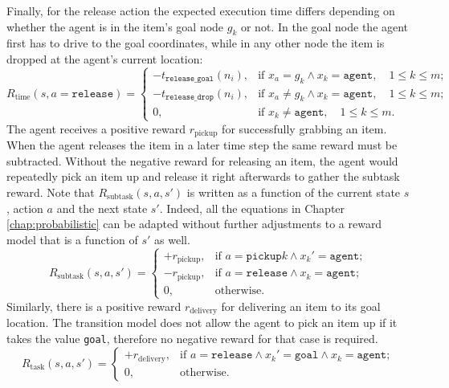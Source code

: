 Finally, for the release action the expected execution time differs depending on whether the agent is in the item's goal node $g_k$ or not. In the goal node the agent first has to drive to the goal coordinates, while in any other node the item is dropped at the agent's current location: 
\begin{equation}
     R_\text{time}(s, a=\texttt{release}) = \begin{cases}
    -t_\texttt{release\_goal}(n_i), & \text{if }x_a=g_k \land x_k=\texttt{agent}, \quad 1 \leq k \leq m; \\
    -t_\texttt{release\_drop}(n_i), & \text{if }x_a\neq g_k \land x_k=\texttt{agent}, \quad 1 \leq k \leq m;\\
    0, & \text{if }x_k \neq \texttt{agent}, \quad 1 \leq k \leq m.
    \end{cases}
\end{equation}
The agent receives a positive reward $r_\text{pickup}$ for successfully grabbing an item. When the agent releases the item in a later time step the same reward must be subtracted. Without the negative reward for releasing an item, the agent would repeatedly pick an item up and release it right afterwards to gather the subtask reward. Note that $R_\text{subtask}(s,a,s')$ is written as a function of the current state $s$, action $a$ and the next state $s'$. Indeed, all the equations in Chapter \ref{chap:probabilistic} can be adapted without further adjustments to a reward model that is a function of $s'$ as well. 
\begin{equation}
    R_\text{subtask}(s,a,s') = \begin{cases}
    +r_\text{pickup}, & \text{if }a=\texttt{pickup}k \land x_k'=\texttt{agent};\\
    -r_\text{pickup}, & \text{if }a=\texttt{release}\land x_k=\texttt{agent};\\
    0, & \text{otherwise}.\end{cases}
\end{equation}
Similarly, there is a positive reward $r_\text{delivery}$ for delivering an item to its goal location. The transition model does not allow the agent to pick an item up if it takes the value \texttt{goal}, therefore no negative reward for that case is required. 
\begin{equation}
    R_\text{task}(s,a,s') = \begin{cases} + r_\text{delivery}, & \text{if }a=\texttt{release}\land x_k'=\texttt{goal}\land x_k=\texttt{agent};\\
    0, & \text{otherwise}.
    \end{cases}
\end{equation}
